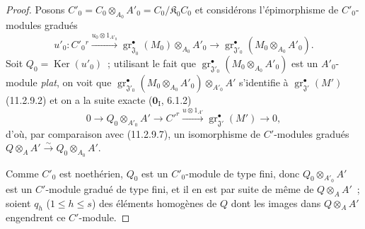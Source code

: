 \begin{proof}
Posons $C'_0=C_0\otimes_{A_0}A'_0=C_0/\mathfrak K_0C_0$ et considérons
l'épimorphisme de $C'_0$-modules gradués
\[
u'_0:C'_0{}^{r}\xrightarrow{u_0\otimes1_{A'_0}}
\operatorname{gr}_{\mathfrak J_0}^\bullet(M_0)\otimes_{A_0}A'_0
\longrightarrow
\operatorname{gr}_{\mathfrak J'_0}^\bullet(M_0\otimes_{A_0}A'_0).
\]
Soit $Q_0=\operatorname{Ker}(u'_0)$~; utilisant le fait que
$\operatorname{gr}_{\mathfrak J'_0}^\bullet(M_0\otimes_{A_0}A'_0)$ est un
$A'_0$-module \emph{plat}, on voit que $\operatorname{gr}_{\mathfrak J'_0}^\bullet(M_0\otimes_{A_0}A'_0)\otimes_{A'_0}A'$
s'identifie à $\operatorname{gr}_{\mathfrak J'}^\bullet(M')$ (11.2.9.2) et on a la
suite exacte ($\mathbf 0_{\mathrm I}$, 6.1.2)
\begin{equation}
0\longrightarrow Q_0\otimes_{A'_0}A'\longrightarrow C'^{r}
\xrightarrow{u\otimes1_{A'}}\operatorname{gr}_{\mathfrak J'}^\bullet(M')
\longrightarrow0,
\label{IV.11.2.9.8-fr}
\tag{11.2.9.8}
\end{equation}
d'où, par comparaison avec (11.2.9.7), un isomorphisme de $C'$-modules
gradués
$Q\otimes_AA'\xrightarrow{\sim}Q_0\otimes_{A_0}A'$.

Comme $C'_0$ est noethérien, $Q_0$ est un $C'_0$-module de type fini, donc
$Q_0\otimes_{A'_0}A'$ est un $C'$-module gradué de type fini, et il en est par
suite de même de $Q\otimes_AA'$~; soient $q_h$ ($1\leq h\leq s$) des éléments
homogènes de $Q$ dont les images dans $Q\otimes_AA'$ engendrent ce
$C'$-module.


\end{proof}

